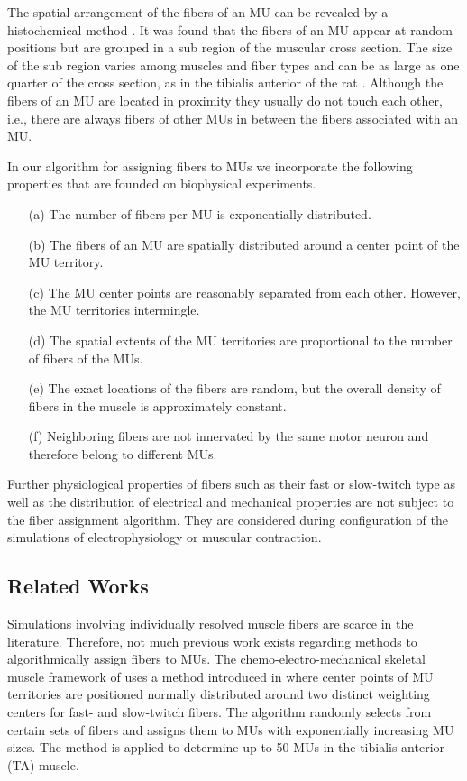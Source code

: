 The spatial arrangement of the fibers of an MU can be revealed by a histochemical method \cite{brandstater1969histochemical}. It was found that the fibers of an MU appear at random positions but are grouped in a sub region of the muscular cross section. The size of the sub region varies among muscles and fiber types and can be as large as one quarter of the cross section, as in the tibialis anterior of the rat \cite{Edstrom1968}. Although the fibers of an MU are located in proximity they usually do not touch each other, i.e., there are always fibers of other MUs in between the fibers associated with an MU.

In our algorithm for assigning fibers to MUs we incorporate the following properties that are founded on biophysical experiments. 
\begin{itemize}
\item[(a)] The number of fibers per MU is  exponentially distributed. 
\item[(b)] The fibers of an MU are spatially distributed around a center point of the MU territory.
\item[(c)] The MU center points are reasonably separated from each other. However, the MU territories intermingle. 
\item[(d)] The spatial extents of the MU territories are proportional to the number of fibers of the MUs. 
\item[(e)] The exact locations of the fibers are random, but the overall density of fibers in the muscle is approximately constant. 
\item[(f)] Neighboring fibers are not innervated by the same motor neuron and therefore belong to different MUs.
\end{itemize}

Further physiological properties of fibers such as their fast or slow-twitch type as well as the distribution of electrical and mechanical properties are not subject to the fiber assignment algorithm. They are considered during configuration of the simulations of electrophysiology or muscular contraction.

\subsection{Related Works}
Simulations involving individually resolved muscle fibers are scarce in the literature. Therefore, not much previous work exists regarding methods to algorithmically assign fibers to MUs. The chemo-electro-mechanical skeletal muscle framework of \cite{Heidlauf2013} uses a method introduced in \cite{Roehrle2012} where center points of MU territories are positioned normally distributed around two distinct weighting centers for fast- and slow-twitch fibers. 
The algorithm randomly selects from certain sets of fibers and assigns them to MUs with exponentially increasing MU sizes. 
The method is applied to determine up to 50 MUs in the tibialis anterior (TA) muscle.

